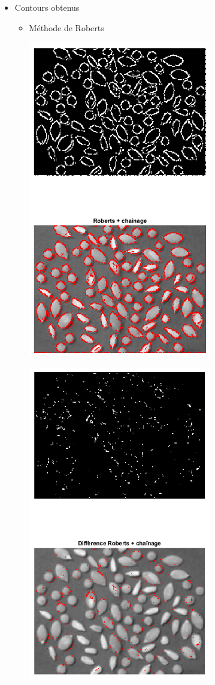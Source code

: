 \documentclass{article}
\begin{document}
\begin{itemize}[leftmargin=*]\renewcommand{\labelitemi}{$\bullet$}
	\item Contours obtenus
	\begin{itemize}[leftmargin=*]
		\item Méthode de Roberts
		
\begin{minipage}[c]{0.46\linewidth}				
	\includegraphics[width=8cm]{Roberts_link.png}
\end{minipage}\hfill
\begin{minipage}[c]{0.46\linewidth}
	\includegraphics[width=8cm]{Diff_Roberts_link.png}

\end{minipage}
\end{itemize}
\end{itemize}
\end{document}
